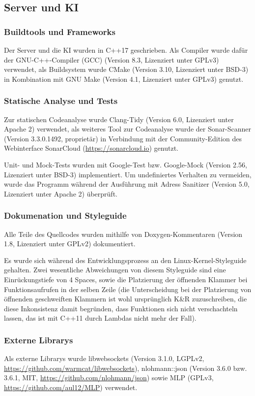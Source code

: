 \subsection{Server und KI}
\subsubsection{Buildtools und Frameworks}
Der Server und die KI wurden in C++17 geschrieben.
Als Compiler wurde dafür der GNU-C++-Compiler (GCC) (Version 8.3, Lizenziert unter GPLv3) verwendet,
als Buildsystem wurde CMake (Version 3.10, Lizenziert unter BSD-3) in Kombination mit GNU Make (Version 4.1, Lizenziert unter GPLv3) genutzt.

\subsubsection{Statische Analyse und Tests}
Zur statischen Codeanalyse wurde Clang-Tidy (Version 6.0, Lizenziert unter Apache 2) verwendet,
als weiteres Tool zur Codeanalyse wurde der Sonar-Scanner (Version 3.3.0.1492, proprietär) in Verbindung mit der Community-Edition des Webinterface SonarCloud (\url{https://sonarcloud.io}) genutzt.

Unit- und Mock-Tests wurden mit Google-Test bzw. Google-Mock (Version 2.56, Lizenziert unter BSD-3) implementiert.
Um undefiniertes Verhalten zu vermeiden, wurde das Programm während der Ausführung mit Adress Sanitizer (Version 5.0, Lizenziert unter Apache 2) überprüft.

\subsubsection{Dokumenation und Styleguide}
Alle Teile des Quellcodes wurden mithilfe von Doxygen-Kommentaren (Version 1.8, Lizenziert unter GPLv2) dokumentiert.

Es wurde sich während des Entwicklungsprozess an den Linux-Kernel-Styleguide gehalten. 
Zwei wesentliche Abweichungen von diesem Styleguide sind eine Einrückungstiefe von 4 Spaces, sowie die Platzierung der öffnenden Klammer bei Funktionsaufrufen in der selben Zeile 
(die Unterscheidung bei der Platzierung von öffnenden geschweiften Klammern ist wohl ursprünglich K\&R zuzuschreiben, die diese Inkonsistenz damit begründen, 
dass Funktionen sich nicht verschachteln lassen, das ist mit C++11 durch Lambdas nicht mehr der Fall).

\subsubsection{Externe Librarys}
Als externe Librarys wurde libwebsockets (Version 3.1.0, LGPLv2, \url{https://github.com/warmcat/libwebsockets}), 
nlohmann::json (Version 3.6.0 bzw. 3.6.1, MIT, \url{https://github.com/nlohmann/json}) sowie MLP (GPLv3, \url{https://github.com/aul12/MLP}) verwendet.

